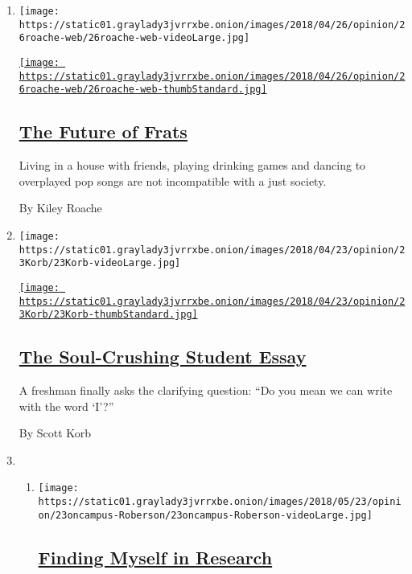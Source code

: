 \begin{enumerate}
\def\labelenumi{\arabic{enumi}.}
\item
  \texttt{[image: https://static01.graylady3jvrrxbe.onion/images/2018/04/26/opinion/26roache-web/26roache-web-videoLarge.jpg]}

  \href{/2018/04/26/opinion/frats-college-greek-life.html}{\texttt{[image: https://static01.graylady3jvrrxbe.onion/images/2018/04/26/opinion/26roache-web/26roache-web-thumbStandard.jpg]}}

  \hypertarget{the-future-of-frats}{%
  \subsection{\texorpdfstring{\href{/2018/04/26/opinion/frats-college-greek-life.html}{The
  Future of Frats}}{The Future of Frats}}\label{the-future-of-frats}}

  Living in a house with friends, playing drinking games and dancing to
  overplayed pop songs are not incompatible with a just society.

  By Kiley Roache
\item
  \texttt{[image: https://static01.graylady3jvrrxbe.onion/images/2018/04/23/opinion/23Korb/23Korb-videoLarge.jpg]}

  \href{/2018/04/21/opinion/the-soul-crushing-student-essay.html}{\texttt{[image: https://static01.graylady3jvrrxbe.onion/images/2018/04/23/opinion/23Korb/23Korb-thumbStandard.jpg]}}

  \hypertarget{the-soul-crushing-student-essay}{%
  \subsection{\texorpdfstring{\href{/2018/04/21/opinion/the-soul-crushing-student-essay.html}{The
  Soul-Crushing Student
  Essay}}{The Soul-Crushing Student Essay}}\label{the-soul-crushing-student-essay}}

  A freshman finally asks the clarifying question: ``Do you mean we can
  write with the word `I'?''

  By Scott Korb
\item
  \begin{enumerate}
  \def\labelenumii{\arabic{enumii}.}
  \item
    \texttt{[image: https://static01.graylady3jvrrxbe.onion/images/2018/05/23/opinion/23oncampus-Roberson/23oncampus-Roberson-videoLarge.jpg]}

    \hypertarget{finding-myself-in-research}{%
    \subsection{\texorpdfstring{\href{/2018/05/23/opinion/graduate-student-cancer-research.html}{Finding
    Myself in
    Research}}{Finding Myself in Research}}\label{finding-myself-in-research}}


\end{enumerate}
\end{enumerate}
